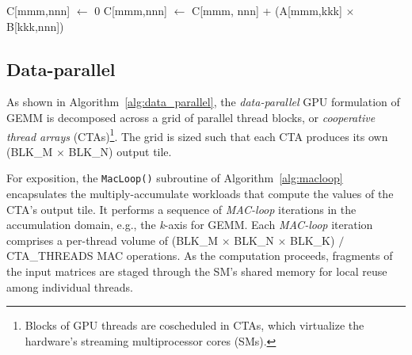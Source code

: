 \begin{algorithm}

    \footnotesize
    \caption{Sequential cache-blocked GEMM\@.}\label{alg:sequential}
    \begin{algorithmic}[1]
                    \State C[mmm,nnn] $\gets$ 0 \EndFor \EndFor {}
                            \State C[mmm,nnn] $\gets$ C[mmm, nnn] +
                            \State \quad (A[mmm,kkk] $\times$ B[kkk,nnn])
                        \EndFor
                    \EndFor \EndFor \EndFor \EndFor \EndFor
    \end{algorithmic}
\end{algorithm}

\subsection{Data-parallel}

As shown in Algorithm~\ref{alg:data_parallel}, the \emph{data-parallel} 
GPU formulation of GEMM is decomposed across a grid of parallel thread blocks, or \emph{cooperative thread arrays} (CTAs)\footnote{Blocks of GPU threads are coscheduled in CTAs, which virtualize the hardware's streaming multiprocessor cores (SMs).}. The grid is sized such that each CTA produces its own (BLK\_M 
$\times$ BLK\_N) output tile. 

For exposition, the \lstinline{MacLoop()} subroutine of Algorithm~\ref{alg:macloop}
encapsulates the multiply-accumulate workloads that compute the values of the CTA's output tile.  It performs a sequence of \emph{MAC-loop} iterations in the accumulation domain, e.g., the \emph{k}-axis for GEMM.  Each \emph{MAC-loop} 
iteration comprises a per-thread volume of (BLK\_M $\times$ BLK\_N $\times$ BLK\_K) 
$/$ CTA\_THREADS MAC operations. As the computation proceeds, fragments of the input matrices are staged through the SM's shared memory for local reuse among individual threads.

